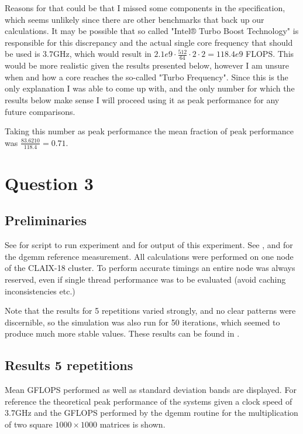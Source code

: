 \documentclass{scrartcl}
\begin{document}
Reasons for that could be that I missed some components in the specification, which seems unlikely since there are other benchmarks that back up our calculations.
It may be possible that so called "Intel® Turbo Boost Technology" is responsible for this discrepancy and the actual single core frequency that should be used is $3.7$GHz, which would result in $2.1e9 \cdot \frac{512}{64} \cdot 2 \cdot 2 = 118.4e9$ FLOPS.
This would be more realistic given the results presented below, however I am unsure when and how a core reaches the so-called "Turbo Frequency".
Since this is the only explanation I was able to come up with, and the only number for which the results below make sense I will proceed using it as peak performance for any future comparisons.

Taking this number as peak performance the mean fraction of peak performance was $\frac{83.6210}{118.4}=0.71$.

\section{Question 3}
\subsection{Preliminaries}
See  for script to run experiment and  for output of this experiment.
See ,  and  for the dgemm reference measurement.
All calculations were performed on one node of the CLAIX-18 cluster.
To perform accurate timings an entire node was always reserved, even if single thread performance was to be evaluated (avoid caching inconsistencies etc.)

Note that the results for 5 repetitions varied strongly, and no clear patterns were discernible, so the simulation was also run for 50 iterations, which seemed to produce much more stable values.
These results can be found in .

\subsection{Results 5 repetitions}
Mean GFLOPS performed as well as standard deviation bands are displayed. 
For reference the theoretical peak performance of the systems given a clock speed of $3.7$GHz and the GFLOPS performed by the dgemm routine for the multiplication of two square $1000 \times 1000$ matrices is shown.
\end{document}
